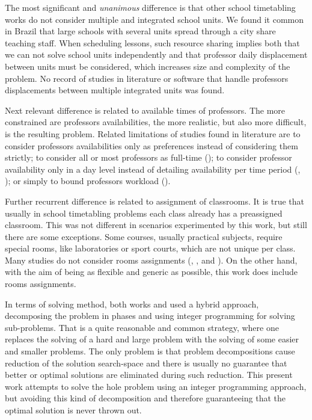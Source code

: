 The most significant and \textit{unanimous} difference is that other school timetabling works do not consider multiple and integrated school units. We found it common in Brazil that large schools with several units spread through a city share teaching staff. When scheduling lessons, such resource sharing implies both that we can not solve school units independently and that professor daily displacement between units must be considered, which increases size and complexity of the problem. No record of studies in literature or software that handle professors displacements between multiple integrated units was found.

Next relevant difference is related to available times of professors. The more constrained are professors availabilities, the more realistic, but also more difficult, is the resulting problem. Related limitations of studies found in literature are to consider professors availabilities only as preferences instead of considering them strictly; to consider all or most professors as full-time (\cite{Birbas2009}); to consider professor availability only in a day level instead of detailing availability per time period (\cite{Birbas2009}, \cite{VGAH2012}); or simply to bound professors workload (\cite{Birbas1997}).

Further recurrent difference is related to assignment of classrooms. It is true that usually in school timetabling problems each class already has a preassigned classroom. This was not different in scenarios experimented by this work, but still there are some exceptions. Some courses, usually practical subjects, require special rooms, like laboratories or sport courts, which are not unique per class. Many studies do not consider rooms assignments (\cite{Birbas1997}, \cite{Birbas2009}, and \cite{Haroldo2012}). On the other hand, with the aim of being as flexible and generic as possible, this work does include rooms assignments.

In terms of solving method, both works \cite{Birbas2009} and \cite{VGAH2012} used a hybrid approach, decomposing the problem in phases and using integer programming for solving sub-problems. That is a quite reasonable and common strategy, where one replaces the solving of a hard and large problem with the solving of some easier and smaller problems. The only problem is that problem decompositions cause reduction of the solution search-space and there is usually no guarantee that better or optimal solutions are eliminated during such reduction. This present work attempts to solve the hole problem using an integer programming approach, but avoiding this kind of decomposition and therefore guaranteeing that the optimal solution is never thrown out.

